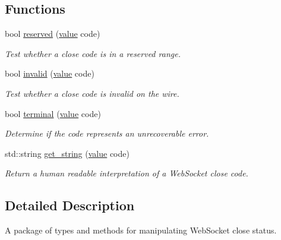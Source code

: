\subsection*{Functions}
\begin{DoxyCompactItemize}
\item 
bool \hyperlink{namespacewebsocketpp_1_1close_1_1status_af26a61f8a8c3247cf656349f96ea3008}{reserved} (\hyperlink{namespacewebsocketpp_1_1close_1_1status_a8614a5c4733d708e2d2a32191c5bef84}{value} code)
\begin{DoxyCompactList}\small\item\em Test whether a close code is in a reserved range. \end{DoxyCompactList}\item 
bool \hyperlink{namespacewebsocketpp_1_1close_1_1status_ad024f852889be28eadcec8209fdf9bc8}{invalid} (\hyperlink{namespacewebsocketpp_1_1close_1_1status_a8614a5c4733d708e2d2a32191c5bef84}{value} code)
\begin{DoxyCompactList}\small\item\em Test whether a close code is invalid on the wire. \end{DoxyCompactList}\item 
bool \hyperlink{namespacewebsocketpp_1_1close_1_1status_a3f9ce953f12693f74493e2eb7a80952b}{terminal} (\hyperlink{namespacewebsocketpp_1_1close_1_1status_a8614a5c4733d708e2d2a32191c5bef84}{value} code)
\begin{DoxyCompactList}\small\item\em Determine if the code represents an unrecoverable error. \end{DoxyCompactList}\item 
std\+::string \hyperlink{namespacewebsocketpp_1_1close_1_1status_a4bf4987c79165b134ed1207a567ce209}{get\+\_\+string} (\hyperlink{namespacewebsocketpp_1_1close_1_1status_a8614a5c4733d708e2d2a32191c5bef84}{value} code)
\begin{DoxyCompactList}\small\item\em Return a human readable interpretation of a Web\+Socket close code. \end{DoxyCompactList}\end{DoxyCompactItemize}


\subsection{Detailed Description}
A package of types and methods for manipulating Web\+Socket close status\textquotesingle{}. 

